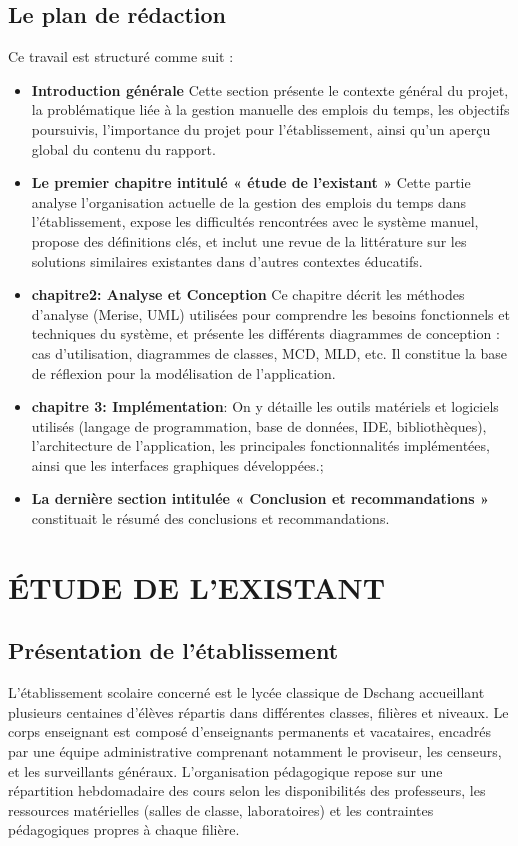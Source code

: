 \documentclass[english,12pt,a4paper]{report}
\begin{document}
\section{Le plan de rédaction }

Ce travail est structuré comme suit :

\begin{itemize}
	\item 	\textbf{Introduction générale} Cette section présente le contexte général du projet, la problématique liée à la gestion manuelle des emplois du temps, les objectifs poursuivis, l’importance du projet pour l’établissement, ainsi qu’un aperçu global du contenu du rapport.
	
	\item 	 \textbf{Le premier chapitre intitulé « étude de l'existant »} Cette partie analyse l’organisation actuelle de la gestion des emplois du temps dans l’établissement, expose les difficultés rencontrées avec le système manuel, propose des définitions clés, et inclut une revue de la littérature sur les solutions similaires existantes dans d’autres contextes éducatifs.
	
	\item  \textbf{chapitre2: Analyse et Conception} Ce chapitre décrit les méthodes d’analyse (Merise, UML) utilisées pour comprendre les besoins fonctionnels et techniques du système, et présente les différents diagrammes de conception : cas d’utilisation, diagrammes de classes, MCD, MLD, etc. Il constitue la base de réflexion pour la modélisation de l'application.
	
	\item 	\textbf{chapitre 3: Implémentation}: On y détaille les outils matériels et logiciels utilisés (langage de programmation, base de données, IDE, bibliothèques), l’architecture de l’application, les principales fonctionnalités implémentées, ainsi que les interfaces graphiques développées.;
	
	\item  \textbf{La dernière section intitulée « Conclusion et recommandations »} constituait le résumé des conclusions et recommandations. 
\end{itemize}

\chapter{ÉTUDE DE L'EXISTANT}
\section{Présentation de l'établissement}
L’établissement scolaire concerné est le lycée classique de Dschang accueillant plusieurs centaines d’élèves répartis dans différentes classes, filières et niveaux. Le corps enseignant est composé d’enseignants permanents et vacataires, encadrés par une équipe administrative comprenant notamment le proviseur, les censeurs, et les surveillants généraux.
L’organisation pédagogique repose sur une répartition hebdomadaire des cours selon les disponibilités des professeurs, les ressources matérielles (salles de classe, laboratoires) et les contraintes pédagogiques propres à chaque filière.
\end{document}
